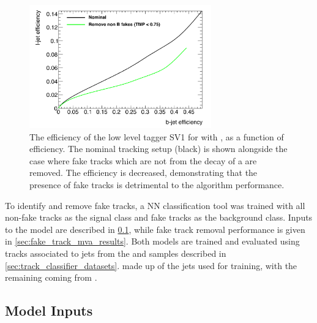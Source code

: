 \begin{figure}[!htbp]
    \centering
    \includegraphics[width=0.7\textwidth]{chapters/4.track_classifier/figs/sv1_perf_nofake.pdf}
    \caption{
      The \ljet efficiency of the low level tagger SV1 for \Zprimejets with \Zprimept, as a function of \bjet efficiency.
      The nominal tracking setup (black) is shown alongside the case where fake tracks which are not from the decay of a \bhadron are removed.
      The \ljet efficiency is decreased, demonstrating that the presence of fake tracks is detrimental to the algorithm performance.
    }
    \label{fig:sv1_perf_nofake}
\end{figure}

To identify and remove fake tracks, a NN classification tool was trained with all non-fake tracks as the signal class and fake tracks as the background class.
Inputs to the model are described in \cref{sec:fake_mva_model_inputs}, while fake track removal performance is given in \cref{sec:fake_track_mva_results}.
Both models are trained and evaluated using tracks associated to jets from the \ttbar and \Zprime samples described in \cref{sec:track_classifier_datasets}.
\ttbarjets made up  of the jets used for training, with the remaining  coming from \Zprimejets.


\subsection{Model Inputs}\label{sec:fake_mva_model_inputs}


